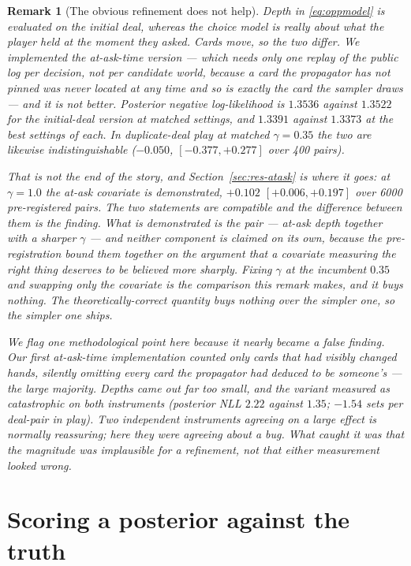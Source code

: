 \documentclass[11pt,a4paper]{article}
\newtheorem{remark}{Remark}
\begin{document}
\begin{remark}[The obvious refinement does not help]
Depth in \eqref{eq:oppmodel} is evaluated on the initial deal, whereas the
choice model is really about what the player held \emph{at the moment they
asked}. Cards move, so the two differ. We implemented the at-ask-time version
--- which needs only one replay of the public log per decision, not per
candidate world, because a card the propagator has not pinned was never located
at any time and so is exactly the card the sampler draws --- and it is not
better. Posterior negative log-likelihood is $1.3536$ against $1.3522$ for the
initial-deal version at matched settings, and $1.3391$ against $1.3373$ at the
best settings of each. In duplicate-deal play at matched $\gamma = 0.35$ the two
are likewise indistinguishable ($-0.050$, $[-0.377, +0.277]$ over 400 pairs).

That is not the end of the story, and Section~\ref{sec:res-atask} is where it
goes: at $\gamma = 1.0$ the at-ask covariate \emph{is} demonstrated, $+0.102$
$[+0.006, +0.197]$ over 6000 pre-registered pairs. The two statements are
compatible and the difference between them is the finding. What is demonstrated
is the \emph{pair} --- at-ask depth together with a sharper $\gamma$ --- and
neither component is claimed on its own, because the pre-registration bound them
together on the argument that a covariate measuring the right thing deserves to
be believed more sharply. Fixing $\gamma$ at the incumbent $0.35$ and swapping
only the covariate is the comparison this remark makes, and it buys nothing.
The theoretically-correct quantity buys nothing over the
simpler one, so the simpler one ships.

We flag one methodological point here because it nearly became a false finding.
Our first at-ask-time implementation counted only cards that had \emph{visibly}
changed hands, silently omitting every card the propagator had \emph{deduced} to
be someone's --- the large majority. Depths came out far too small, and the
variant measured as catastrophic on both instruments (posterior NLL $2.22$
against $1.35$; $-1.54$ sets per deal-pair in play). Two independent instruments
agreeing on a large effect is normally reassuring; here they were agreeing about
a bug. What caught it was that the magnitude was implausible for a refinement,
not that either measurement looked wrong.
\end{remark}

\section{Scoring a posterior against the truth}
\label{sec:posterior-quality}
\end{document}
